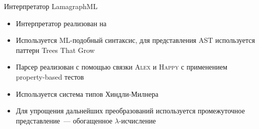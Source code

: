 \documentclass
  [ russian
  , aspectratio=169 %
  ] {beamer}
\begin{document}
\begin{frame}{Интерпретатор LamagraphML}

    \begin{itemize}
        \item Интерпретатор реализован на \Haskell{}
        \item Используется ML-подобный синтаксис, для представления AST используется паттерн Trees That Grow
        \item Парсер реализован с помощью связки \textsc{Alex} и \textsc{Happy} с применением property-based тестов
        \item Используется система типов Хиндли-Милнера
        \item Для упрощения дальнейших преобразований используется промежуточное представление~--- обогащенное $\lambda$-исчисление
    \end{itemize}

\end{frame}
\end{document}
